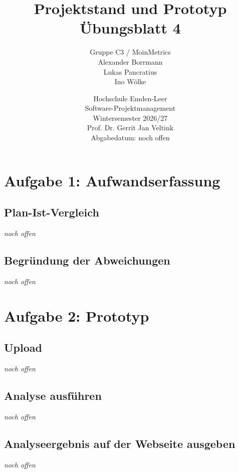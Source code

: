 \documentclass[a4paper,10pt]{article}
\title{Projektstand und Prototyp\\{\large Übungsblatt 4}}
\author{Gruppe C3 / MoinMetrics\\{}Alexander Borrmann\\{}Lukas Pancratius\\{}Ino Wölke}
\date{Hochschule Emden-Leer\\Software-Projektmanagement\\Wintersemester 2026/27\\Prof. Dr. Gerrit Jan Veltink\\[1em]Abgabedatum: noch offen}
\newcommand{\offen}{\emph{noch offen}}
\begin{document}
\maketitle
\thispagestyle{fancy}
\clearpage
\section*{Aufgabe 1: Aufwandserfassung}
\subsection*{Plan-Ist-Vergleich}
\offen

\subsection*{Begründung der Abweichungen}
\offen

\section*{Aufgabe 2: Prototyp}
\subsection*{Upload}
\offen

\subsection*{Analyse ausführen}
\offen

\subsection*{Analyseergebnis auf der Webseite ausgeben}
\offen
\end{document}
